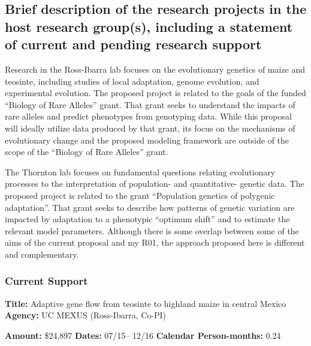 \renewcommand{\thepage}{Sponsoring Scientist Statement - Page \arabic{page} of 3}

\subsection{Brief description of the research projects in the host research group(s), including a statement of current and pending research support} 

Research in the Ross-Ibarra lab focuses on the evolutionary genetics of maize and teosinte, including studies of local adaptation, genome evolution, and experimental evolution. The proposed project is related to the goals of the funded ``Biology of Rare Alleles'' grant.  That grant seeks to understand the impacts of rare alleles and predict phenotypes from genotyping data. While this proposal will ideally utilize data produced by that grant, its focus on the mechanisms of evolutionary change and the proposed modeling framework are outside of the scope of the ``Biology of Rare Alleles'' grant. 

The Thornton lab focuses on fundamental questions relating evolutionary processes to the interpretation of population- and quantitative- genetic data.  The proposed project is related to the grant ``Population genetics of polygenic adaptation''.   That grant seeks to describe how patterns of genetic variation are impacted by adaptation to a phenotypic ``optimum shift'' and to estimate the relevant model parameters. Although there is some overlap between some of the aims of the current proposal and my R01, the approach proposed here is different and complementary.

\subsubsection*{Current Support}


\textbf{Title:} Adaptive gene flow from teosinte to highland maize in central Mexico
\textbf{Agency:} UC MEXUS (Ross-Ibarra, Co-PI)

\textbf{Amount:} \$24,897
\textbf{Dates:} 07/15– 12/16
\textbf{Calendar Person-months:} 0.24

